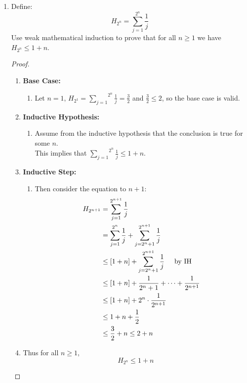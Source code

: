 \documentclass[class=article, crop=false]{standalone}
\def\inlinesum#1#2{\overset{#2}{\underset{#1}{\sum}}}
\begin{document}
\begin{enumerate}
	\item
	  Define:
	  $$H_{2^n}=\inlinesum{j=1}{2^n}\frac1j$$
	  Use weak mathematical induction to prove that
	  for all $n\geq 1$ we have $H_{2^n}\leq 1+n$.
	  \begin{proof}
		$ $
		\begin{enumerate}
		  \item[] \textbf{Base Case:}
			\begin{enumerate}
			  \item[] Let $n=1$, $H_{2^1}=\inlinesum{j=1}{2^n}\frac1j = \frac32$ and $\frac32 \leq 2$, so the base case is valid.
			\end{enumerate} 
		  \item[] \textbf{Inductive Hypothesis:}
			\begin{enumerate}
			  \item[] Assume from the inductive hypothesis that the conclusion is true for some $n$. \\
			  This implies that $\inlinesum{j=1}{2^n}\frac1j \leq 1+n$.
			\end{enumerate}
		  \item[] \textbf{Inductive Step:}
			\begin{enumerate}
			  \item[] Then consider the equation to $n+1$:
				\begin{align*}
				  H_{2^{n+1}} &= \sum_{j=1}^{2^{n+1}} \frac{1}{j} \\
				  &= \sum_{j=1}^{2^n} \frac{1}{j} + \sum_{j=2^n +1}^{2^{n+1}} \frac{1}{j} \\
				  &\leq \left[1+n\right] + \sum_{j=2^n +1}^{2^{n+1}} \frac{1}{j} \hspace{5mm}\text{by IH} \\
				  &\leq \left[1+n\right] + \frac{1}{2^n +1}+\cdots +\frac{1}{2^{n+1}}\\
				  &\leq \left[1+n\right] + 2^n\cdot \frac{1}{2^{n+1}} \\
				  &\leq 1 + n + \frac{1}{2} \\
				  &\leq \frac{3}{2} + n \leq 2 + n
				\end{align*}
			\end{enumerate}
		  \item[] Thus for all $n\geq 1$, $$H_{2^n}\leq 1+n$$
		\end{enumerate}
	  \end{proof}
	

\end{enumerate}
\end{document}
